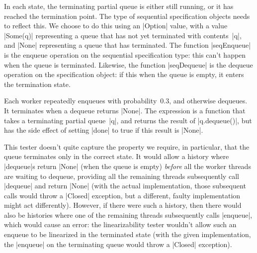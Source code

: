 

In each state, the terminating partial queue is either still running, or it
has reached the termination point.  The type of sequential specification
objects needs to reflect this.  We choose to do this using an |Option| value,
with a value |Some(q)| representing a queue that has not yet terminated with
contents~|q|, and |None| representing a queue that has terminated.  The
function |seqEnqueue| is the enqueue operation on the sequential specification
type: this can't happen when the queue is terminated.  Likewise, the function
|seqDequeue| is the dequeue operation on the specification object: if this
when the queue is empty, it enters the termination state.

Each worker repeatedly enqueues with probability~$0.3$, and otherwise
dequeues.  It terminates when a dequeue returns |None|.  The expression
is a function that takes a terminating partial queue~|q|, and returns the
result of |q.dequeue()|, but has the side effect of setting |done| to true
if this result is |None|.  

This tester doesn't quite capture the property we require, in particular, that
the queue terminates only in the correct state.  It would allow a history
where |dequeue|s return |None| (when the queue is empty) \emph{before} all the
worker threads are waiting to dequeue, providing all the remaining threads
subsequently call |dequeue| and return |None| (with the actual implementation,
those subsequent calls would throw a |Closed| exception, but a different,
faulty implementation might act differently).  However, if there were such a
history, then there would also be histories where one of the remaining threads
subsequently calls |enqueue|, which would cause an error: the linearizability
tester wouldn't allow such an enqueue to be linearized in the terminated state
(with the given implementation, the |enqueue| on the terminating queue would
throw a |Closed| exception).
